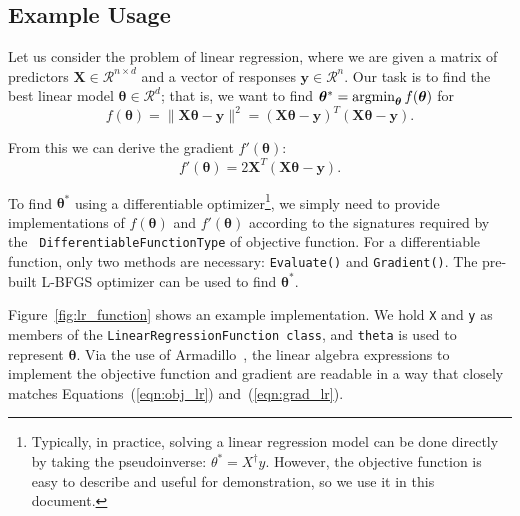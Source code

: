 \subsection{Example Usage}
\label{sec:linreg_example}

Let us consider the problem of linear regression, where we are
given a matrix of predictors $\bm X \in \mathcal{R}^{n \times d}$ and a vector
of responses $\bm y \in \mathcal{R}^n$.  Our task is to find the best linear
model $\bm \theta \in \mathcal{R}^d$; that is, we want to find
$\bm \theta^* = \operatornamewithlimits{argmin}_{\bm\theta} f(\bm \theta)$ for
%
\begin{equation}
f(\bm \theta) = \| \bm X \bm \theta - \bm y \|^2 = (\bm X \bm \theta - \bm y)^T
(\bm X \bm \theta - \bm y).
\label{eqn:obj_lr}
\end{equation}

\noindent
From this we can derive the gradient $f'(\bm \theta)$:
%
\begin{equation}
f'(\bm \theta) = 2 \bm X^T (\bm X \bm \theta - \bm y).
\label{eqn:grad_lr}
\end{equation}

To find $\bm \theta^*$ using a differentiable
optimizer\footnote{Typically, in practice, solving a linear regression model can
be done directly by taking the pseudoinverse: $\theta^* = X^\dagger y$.  However,
the objective function is easy to describe and useful for demonstration, so we
use it in this document.}, we simply need to provide implementations of $f(\bm \theta)$ and
$f'(\bm \theta)$ according to the signatures required by the {\tt
DifferentiableFunctionType} of objective function.  For a differentiable
function, only two methods are necessary: {\tt Evaluate()} and {\tt Gradient()}.
The pre-built L-BFGS optimizer can be used to find $\bm \theta^*$.

Figure~\ref{fig:lr_function} shows an example implementation.
We hold {\tt X} and {\tt y} as members of the
{\tt LinearRegressionFunction class},
and {\tt theta} is used to represent $\bm \theta$.
Via the use of Armadillo~\cite{sanderson2016armadillo},
the linear algebra expressions to implement the objective function and gradient
are readable in a way that closely matches Equations~(\ref{eqn:obj_lr}) and~(\ref{eqn:grad_lr}).





